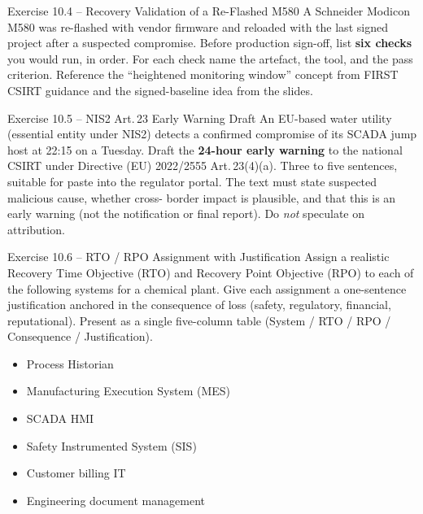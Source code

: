 \documentclass[11pt,a4paper]{article}
\begin{document}
\begin{taskbox}{Exercise 10.4 -- Recovery Validation of a Re-Flashed M580}
A Schneider Modicon M580 was re-flashed with vendor firmware and reloaded with
the last signed project after a suspected compromise. Before production sign-off,
list \textbf{six checks} you would run, in order. For each check name the
artefact, the tool, and the pass criterion. Reference the ``heightened
monitoring window'' concept from FIRST CSIRT guidance and the signed-baseline
idea from the slides.
\end{taskbox}

\begin{taskbox}{Exercise 10.5 -- NIS2 Art.\,23 Early Warning Draft}
An EU-based water utility (essential entity under NIS2) detects a confirmed
compromise of its SCADA jump host at 22:15 on a Tuesday. Draft the
\textbf{24-hour early warning} to the national CSIRT under Directive (EU)
2022/2555 Art.\,23(4)(a). Three to five sentences, suitable for paste into the
regulator portal. The text must state suspected malicious cause, whether cross-
border impact is plausible, and that this is an early warning (not the
notification or final report). Do \emph{not} speculate on attribution.
\end{taskbox}

\begin{taskbox}{Exercise 10.6 -- RTO / RPO Assignment with Justification}
Assign a realistic Recovery Time Objective (RTO) and Recovery Point Objective
(RPO) to each of the following systems for a chemical plant. Give each
assignment a one-sentence justification anchored in the consequence of loss
(safety, regulatory, financial, reputational). Present as a single five-column
table (System / RTO / RPO / Consequence / Justification).
\begin{itemize}\setlength{\itemsep}{1pt}
  \item Process Historian
  \item Manufacturing Execution System (MES)
  \item SCADA HMI
  \item Safety Instrumented System (SIS)
  \item Customer billing IT
  \item Engineering document management
\end{itemize}
\end{taskbox}
\end{document}
